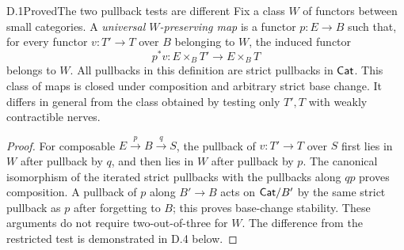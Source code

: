 \begin{claim}{D.1}{Proved}{The two pullback tests are different}
Fix a class $W$ of functors between small categories. A \emph{universal $W$-preserving map} is a functor $p:E\to B$ such that, for every functor $v:T'\to T$ over $B$ belonging to $W$, the induced functor
\[
 p^*v:E\times_B T'\longrightarrow E\times_B T
\]
belongs to $W$. All pullbacks in this definition are strict pullbacks in $\mathsf{Cat}$. This class of maps is closed under composition and arbitrary strict base change. It differs in general from the class obtained by testing only $T',T$ with weakly contractible nerves.
\end{claim}
\begin{proof}
For composable $E\xrightarrow{p}B\xrightarrow{q}S$, the pullback of $v:T'\to T$ over $S$ first lies in $W$ after pullback by $q$, and then lies in $W$ after pullback by $p$. The canonical isomorphism of the iterated strict pullbacks with the pullbacks along $qp$ proves composition. A pullback of $p$ along $B'\to B$ acts on $\mathsf{Cat}/B'$ by the same strict pullback as $p$ after forgetting to $B$; this proves base-change stability. These arguments do not require two-out-of-three for $W$. The difference from the restricted test is demonstrated in D.4 below.
\end{proof}

